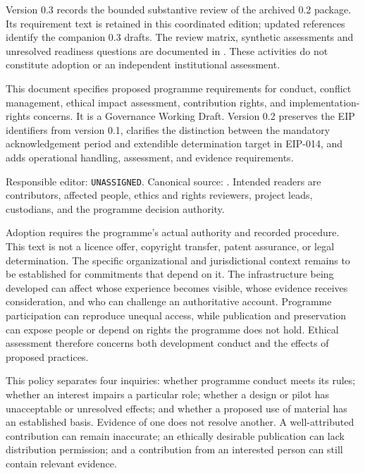 \documentclass[11pt,a4paper]{article}
\begin{document}
\GSPfrontmatter
{}
Version 0.3 records the bounded substantive review of the archived 0.2 package. Its requirement text is retained in this coordinated edition; updated references identify the companion 0.3 drafts. The review matrix, synthetic assessments and unresolved readiness questions are documented in . These activities do not constitute adoption or an independent institutional assessment.

This document specifies proposed programme requirements for conduct, conflict management, ethical impact assessment, contribution rights, and implementation-rights concerns. It is a Governance Working Draft. Version 0.2 preserves the EIP identifiers from version 0.1, clarifies the distinction between the mandatory acknowledgement period and extendible determination target in EIP-014, and adds operational handling, assessment, and evidence requirements.

Responsible editor: \texttt{UNASSIGNED}. Canonical source: . Intended readers are contributors, affected people, ethics and rights reviewers, project leads, custodians, and the programme decision authority.

Adoption requires the programme's actual authority and recorded procedure. This text is not a licence offer, copyright transfer, patent assurance, or legal determination. The specific organizational and jurisdictional context remains to be established for commitments that depend on it.
\tableofcontents
\clearpage
{}
The infrastructure being developed can affect whose experience becomes visible, whose evidence receives consideration, and who can challenge an authoritative account. Programme participation can reproduce unequal access, while publication and preservation can expose people or depend on rights the programme does not hold. Ethical assessment therefore concerns both development conduct and the effects of proposed practices.

This policy separates four inquiries: whether programme conduct meets its rules; whether an interest impairs a particular role; whether a design or pilot has unacceptable or unresolved effects; and whether a proposed use of material has an established basis. Evidence of one does not resolve another. A well-attributed contribution can remain inaccurate; an ethically desirable publication can lack distribution permission; and a contribution from an interested person can still contain relevant evidence.
\end{document}
